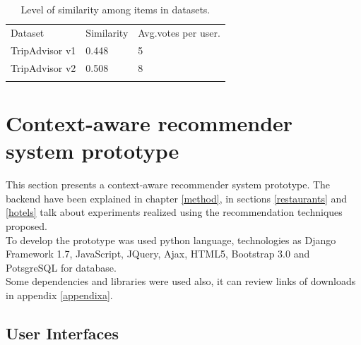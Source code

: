 \begin{table}
\centering
\small
\captionsetup{font=footnotesize}
\caption{Level of similarity among items in datasets. }
\label{tab:5}      
\begin{tabular}{lll}
\hline\noalign{\smallskip}
Dataset  & Similarity  & Avg.votes per user. \\
\noalign{\smallskip}\hline\noalign{\smallskip}
TripAdvisor v1 & 0.448  & 5  \\
TripAdvisor v2 & 0.508  & 8  \\
\noalign{\smallskip}\hline
\end{tabular}
\end{table}

\section{Context-aware recommender system prototype} 

This section presents a context-aware recommender system prototype.
The backend have been explained in chapter  \ref{method},  in sections
 \ref{restaurants} and  \ref{hotels} talk about experiments realized
using the recommendation techniques proposed. \\ To develop the prototype
was used python language, technologies as Django Framework 1.7,
JavaScript, JQuery, Ajax, HTML5, Bootstrap 3.0  and PotsgreSQL for database.\\ 
Some dependencies and libraries were used also, it can review links of
downloads in appendix  \ref{appendixa}.

\subsection{User Interfaces}

